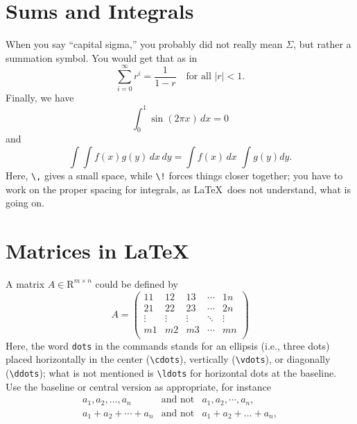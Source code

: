 \section{Sums and Integrals}
When you say ``capital sigma,'' you probably did not really mean $\Sigma$,
but rather a summation symbol. You would get that as in\premathpar
\begin{displaymath}
  \sum_{i=0}^{\infty} r^i = \frac{1}{1 - r} \quad \mbox{for all $|r| < 1$}.
\end{displaymath}
Finally, we have\premathpar
\begin{displaymath}
  \int_0^1 \sin(2 \pi x) \, dx = 0
\end{displaymath}
and\premathpar
\begin{displaymath}
  \int \! \! \int f(x) g(y) \, dx \, dy = \int f(x) \, dx \,\, \int g(y) dy.
\end{displaymath}
Here, \verb+\,+ gives a small space, while \verb+\!+ forces things closer
together; you have to work on the proper spacing for integrals, as \LaTeX\
does not understand, what is going on.
\clearpage %
\section{Matrices in \LaTeX}
A matrix $A \in \mathrm{R}^{m \times n}$ could be defined by\premathpar
\begin{displaymath}
  A = \left( \begin{array}{ccccc}
        11     & 12     & 13     & \cdots & 1n     \\
        21     & 22     & 23     & \cdots & 2n     \\
        \vdots & \vdots & \vdots & \ddots & \vdots \\
        m1     & m2     & m3     & \cdots & mn     \\
      \end{array} \right)
\end{displaymath}
Here, the word \verb+dots+ in the commands stands for an ellipsis
(i.e., three dots) placed horizontally in the center (\verb+\cdots+),
vertically (\verb+\vdots+), or diagonally (\verb+\ddots+); what is
not mentioned is \verb+\ldots+ for horizontal dots at the baseline.
Use the baseline or central version as appropriate, for instance\premathpar
\begin{eqnarray*}
  a_1, a_2, \ldots, a_n & \mbox{and not} & a_1, a_2, \cdots, a_n, \\
  a_1 + a_2 + \cdots + a_n & \mbox{and not} & a_1 + a_2 + \ldots + a_n, \\
\end{eqnarray*}

